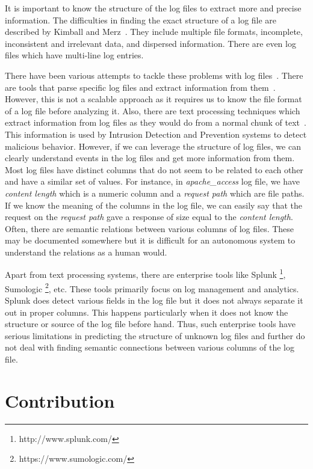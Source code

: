 It is important to know the structure of the log files to extract more and precise information. The difficulties in finding the exact structure of a log file are described by Kimball and Merz~\cite{kimball_log_problem}. They include multiple file formats, incomplete, inconsistent and irrelevant data, and dispersed information. There are even log files which have multi-line log entries.

There have been various attempts to tackle these problems with log files~\cite{log_parser_2005}. There are tools that parse specific log files and extract information from them~\cite{weblog_expert}. However, this is not a scalable approach as it requires us to know the file format of a log file before analyzing it. Also, there are text processing techniques which extract information from log files as they would do from a normal chunk of text~\cite{saneifar2009terminology}. This information is used by Intrusion Detection and Prevention systems to detect malicious behavior. However, if we can leverage the structure of log files, we can clearly understand events in the log files and get more information from them. Most log files have distinct columns that do not seem to be related to each other and have a similar set of values. For instance, in \textit{apache\_access} log file, we have \textit{content length} which is a numeric column and a \textit{request path} which are file paths. If we know the meaning of the columns in the log file, we can easily say that the request on the \textit{request path} gave a response of size equal to the \textit{content length}. Often, there are semantic relations between various columns of log files. These may be documented somewhere but it is difficult for an autonomous system to understand the relations as a human would.

Apart from text processing systems, there are enterprise tools like Splunk \footnote{http://www.splunk.com/}, Sumologic \footnote{https://www.sumologic.com/}, etc. These tools primarily focus on log management and analytics. Splunk does detect various fields in the log file but it does not always separate it out in proper columns. This happens particularly when it does not know the structure or source of the log file before hand. Thus, such enterprise tools have serious limitations in predicting the structure of unknown log files and further do not deal with finding semantic connections between various columns of the log file.


\section{Contribution}

